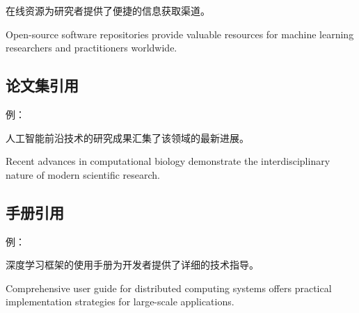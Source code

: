 在线资源为研究者提供了便捷的信息获取渠道\cite{online2021}。

Open-source software repositories\cite{github2021ml} provide valuable resources for machine learning researchers and practitioners worldwide.

\subsection{论文集引用}

例：

人工智能前沿技术的研究成果\cite{collection2020}汇集了该领域的最新进展。

Recent advances in computational biology\cite{collection2021bio} demonstrate the interdisciplinary nature of modern scientific research.

\subsection{手册引用}

例：

深度学习框架的使用手册\cite{manual2021}为开发者提供了详细的技术指导。

Comprehensive user guide for distributed computing systems\cite{manual2021distributed} offers practical implementation strategies for large-scale applications.
